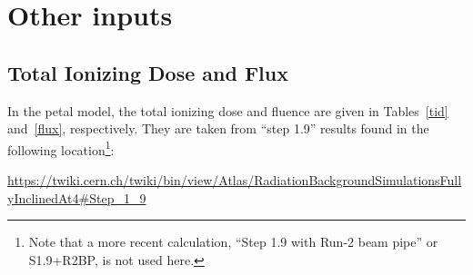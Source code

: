 
\section{Other inputs}

\subsection{Total Ionizing Dose and Flux}

In the petal model, the total ionizing dose and fluence are given in Tables~\ref{tid} and~\ref{flux},
respectively. They are taken from ``step 1.9'' results found in the following location\footnote{
Note that a more recent calculation, ``Step 1.9 with Run-2 beam pipe'' or S1.9+R2BP, is not used here.
}:

\url{https://twiki.cern.ch/twiki/bin/view/Atlas/RadiationBackgroundSimulationsFullyInclinedAt4#Step_1_9}

\begin{table}[ht]
\begin{centering} %
\caption{TID in 3000 fb$^{-1}$ of collected data [Rad]}
\label{tid}
\end{centering}
\end{table}


